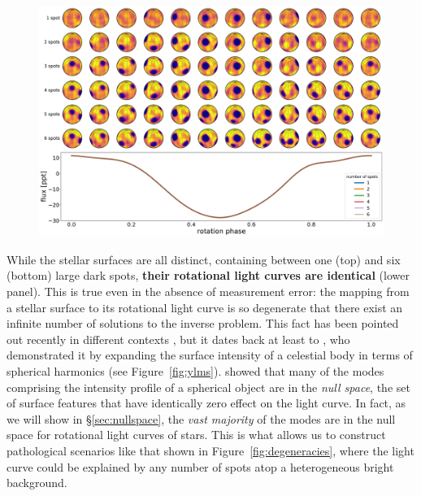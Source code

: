 \documentclass[modern]{aastex62}
\begin{document}
\begin{figure}[t!]
    \begin{centering}
        \includegraphics[width=\linewidth]{figures/degeneracies.pdf}
    \end{centering}
\end{figure}

While the stellar surfaces are all distinct, containing between one (top)
and six (bottom) large dark spots,
\textbf{their rotational light curves are identical}
(lower panel). This is true even in the absence of measurement
error: the mapping from a stellar surface
to its rotational light curve is so degenerate that there exist an infinite number of solutions
to the inverse problem. This fact has been pointed out recently in different contexts
\citep[e.g.,][]{Cowan2013,Luger2019,Basri2020}, but it dates back at least to
\citet{Russell1906}, who demonstrated it by expanding the surface
intensity of a celestial body in terms of spherical harmonics
(see Figure~\ref{fig:ylms}). \citet{Russell1906} showed
that many of the modes comprising the intensity profile of a spherical
object are in the \emph{null space}, the set of surface features that have identically
zero effect on the light curve. In fact, as we will show in \S\ref{sec:nullspace},
the \emph{vast majority} of the modes are in the null space for rotational
light curves of stars. This is what allows us to construct pathological
scenarios like that shown in Figure~\ref{fig:degeneracies}, where the light curve
could be explained by any number of spots atop a heterogeneous bright background.
\end{document}
